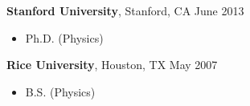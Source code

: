 \documentclass[margin,line]{resume}
\begin{document}
\begin{resume}
    \textbf{Stanford University}, Stanford, CA \hfill June 2013\vspace{-3mm}\\\vspace{-1mm}%
    \begin{itemize}
    \item Ph.D. (Physics)
    \end{itemize}\vspace{-1.5mm}
    
    \textbf{Rice University}, Houston, TX \hfill May 2007\vspace{-3mm}\\\vspace{-1mm}%
    \begin{itemize}
    \item B.S. (Physics)
    \end{itemize}\vspace{-1.5mm}
 
 

    



\end{resume}
\end{document}
